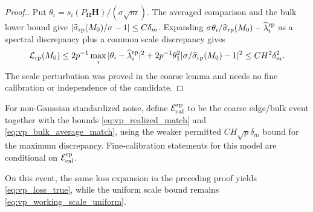 \documentclass[numsec,webpdf,modern,large,namedate]{oup-authoring-template}
\theoremstyle{plain}
\theoremstyle{remark}
\newcommand{\bH}{\bm{H}}
\newcommand{\bOmega}{\bm{\Omega}}
\newif\ifmarkchanges
\newenvironment{revision}{\begingroup\ifmarkchanges\color{red}\fi}{\endgroup}
\begin{document}
\begin{revision}
\begin{proof}[Proof.]
Put $\theta_i=s_i(P_{\bOmega}\bH)/(\sigma\sqrt m)$.
The averaged comparison and the bulk lower bound give
$|\widehat\sigma_{\rm rp}(M_0)/\sigma-1|\le C\delta_m$.
Expanding
$\sigma\theta_i/\widehat\sigma_{\rm rp}(M_0)-\widehat\lambda_i^{\rm rp}$
as a spectral discrepancy plus a common scale discrepancy gives
\[
 \mathcal L_{\rm rp}(M_0)
 \le2p^{-1}\max_i|\theta_i-\widehat\lambda_i^{\rm rp}|^2
 +2p^{-1}\theta_1^2
       |\sigma/\widehat\sigma_{\rm rp}(M_0)-1|^2
 \le CH^2\delta_m^2.
\]
The scale perturbation was proved in the coarse lemma and needs no fine
calibration or independence of the candidate.
\end{proof}


For non-Gaussian standardized noise, define $\mathcal E_{\rm cal}^{\rm rp}$
to be the coarse edge/bulk event together with the bounds
\eqref{eq:vp_realized_match} and \eqref{eq:vp_bulk_average_match}, using
the weaker permitted $CH\sqrt p\delta_m$ bound for the maximum discrepancy.
Fine-calibration statements for this model are conditional on
$\mathcal E_{\rm cal}^{\rm rp}$.

On this event, the same loss expansion in the preceding proof yields
\eqref{eq:vp_loss_true}, while the uniform scale bound remains
\eqref{eq:vp_working_scale_uniform}.


\end{revision}
\end{document}
